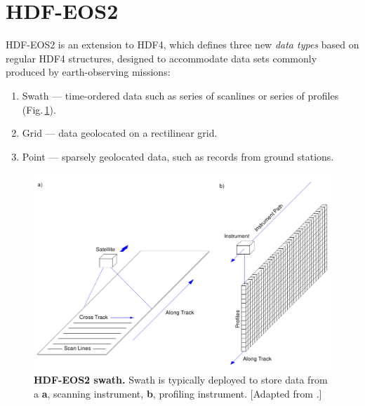 \section{HDF-EOS2}\label{sec:hdf-eos2}
HDF-EOS2 is an extension to HDF4, which defines three new \textit{data types}
based on regular HDF4 structures, designed to accommodate data sets commonly
produced by earth-observing missions: 

\begin{enumerate}
\item Swath --- time-ordered data such as series of scanlines or series of
profiles (Fig.\,\ref{fig:swath}).
\item Grid --- data geolocated on a rectilinear grid.
\item Point --- sparsely geolocated data, such as records from ground stations.
\end{enumerate}

\begin{figure}[h]
\includegraphics[width=\textwidth]{images/swath.pdf}
\caption[HDF-EOS2 swath]{\textbf{HDF-EOS2 swath.} Swath is typically deployed to store
data from a \textbf{a},
scanning instrument, \textbf{b}, profiling instrument. [Adapted from
\cite{HDF_EOS_UsersGuideVol1_2009}.]}
\label{fig:swath}
\end{figure}

